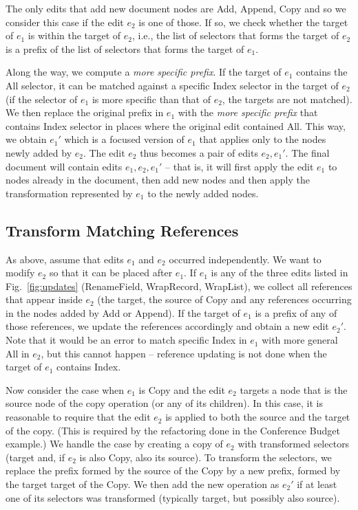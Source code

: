 \documentclass[sigconf]{acmart}
\newcommand{\ident}[1]{{\sffamily #1}}
\begin{document}
The only edits that add new document nodes are \ident{Add}, \ident{Append}, \ident{Copy} and
so we consider this case if the edit $e_2$ is one of those. If so, we check
whether the target of $e_1$ is within the target of $e_2$, i.e., the list of selectors that
forms the target of $e_2$ is a prefix of the list of selectors that forms the target of $e_1$.

Along the way, we compute a \emph{more specific prefix}. If the target of $e_1$ contains
the \ident{All} selector, it can be matched against a specific \ident{Index} selector in the
target of $e_2$ (if the selector of $e_1$ is more specific than that of $e_2$, the targets
are not matched). We then replace the original prefix in $e_1$ with the \emph{more specific prefix}
that contains \ident{Index} selector in places where the original edit contained \ident{All}.
This way, we obtain $e_1'$ which is a focused version of $e_1$ that applies only to the
nodes newly added by $e_2$. The edit $e_2$ thus becomes a pair of edits $e_2, e_1'$.
The final document will contain edits $e_1, e_2, e_1'$ -- that is, it will first apply the edit
$e_1$ to nodes already in the document, then add new nodes and then apply the transformation
represented by $e_1$ to the newly added nodes.

\subsection{Transform Matching References}
\label{app:merge-transform-refs}

As above, assume that edits $e_1$ and $e_2$ occurred independently. We want to
modify $e_2$ so that it can be placed after $e_1$. If $e_1$ is any of the three edits
listed in Fig.~\ref{fig:updates} (\ident{RenameField}, \ident{WrapRecord}, \ident{WrapList}),
we collect all references that appear inside $e_2$ (the target, the source of \ident{Copy}
and any references occurring in the nodes added by \ident{Add} or \ident{Append}).
If the target of $e_1$ is a prefix of any of those references, we update the references
accordingly and obtain a new edit $e_2'$. Note that it would be an error to match specific
\ident{Index} in $e_1$ with more general \ident{All} in $e_2$, but this cannot happen --
reference updating is not done when the target of $e_1$ contains \ident{Index}.

Now consider the case when $e_1$ is \ident{Copy} and the edit $e_2$ targets a node that is
the source node of the copy operation (or any of its children). In this case, it is reasonable
to require that the edit $e_2$ is applied to both the source and the target of the copy.
(This is required by the refactoring done in the Conference Budget example.)
We handle the case by creating a copy of $e_2$ with transformed selectors (target and, if $e_2$
is also \ident{Copy}, also its source). To transform the selectors, we replace the prefix
formed by the source of the \ident{Copy} by a new prefix, formed by the target target of
the \ident{Copy}. We then add the new operation as $e_2'$ if at least one of its selectors
was transformed (typically target, but possibly also source).
\end{document}
